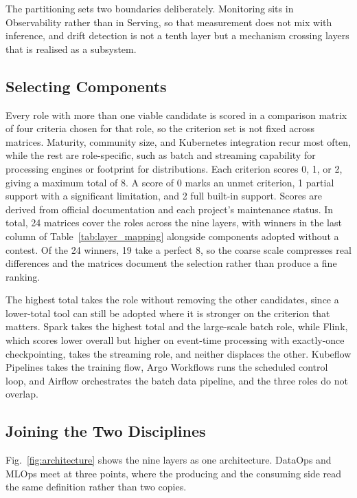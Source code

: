 The partitioning sets two boundaries deliberately. Monitoring sits in Observability rather than in Serving, so that measurement does not mix with inference, and drift detection is not a tenth layer but a mechanism crossing layers that is realised as a subsystem.

\subsection{Selecting Components}
\label{subsec:selection}

Every role with more than one viable candidate is scored in a comparison matrix of four criteria chosen for that role, so the criterion set is not fixed across matrices. Maturity, community size, and Kubernetes integration recur most often, while the rest are role-specific, such as batch and streaming capability for processing engines or footprint for distributions. Each criterion scores 0, 1, or 2, giving a maximum total of 8. A score of 0 marks an unmet criterion, 1 partial support with a significant limitation, and 2 full built-in support. Scores are derived from official documentation and each project's maintenance status. In total, 24 matrices cover the roles across the nine layers, with winners in the last column of Table~\ref{tab:layer_mapping} alongside components adopted without a contest. Of the 24 winners, 19 take a perfect 8, so the coarse scale compresses real differences and the matrices document the selection rather than produce a fine ranking.

The highest total takes the role without removing the other candidates, since a lower-total tool can still be adopted where it is stronger on the criterion that matters. Spark takes the highest total and the large-scale batch role, while Flink, which scores lower overall but higher on event-time processing with exactly-once checkpointing, takes the streaming role, and neither displaces the other. Kubeflow Pipelines takes the training flow, Argo Workflows runs the scheduled control loop, and Airflow orchestrates the batch data pipeline, and the three roles do not overlap.

\subsection{Joining the Two Disciplines}
\label{subsec:bridges}

Fig.~\ref{fig:architecture} shows the nine layers as one architecture. DataOps and MLOps meet at three points, where the producing and the consuming side read the same definition rather than two copies.

